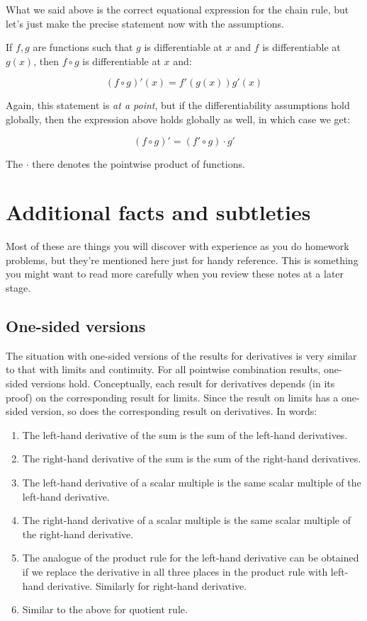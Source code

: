 \documentclass[10pt]{amsart}
\begin{document}
What we said above is the correct equational expression for the chain
rule, but let's just make the precise statement now with the assumptions.

If $f,g$ are functions such that $g$ is differentiable at $x$ and $f$
is differentiable at $g(x)$, then $f \circ g$ is differentiable at $x$
and:

$$(f \circ g)'(x) = f'(g(x))g'(x)$$

Again, this statement is {\em at a point}, but if the
differentiability assumptions hold globally, then the expression above
holds globally as well, in which case we get:

$$(f \circ g)' = (f' \circ g) \cdot g'$$

The $\cdot$ there denotes the pointwise product of functions.

\section{Additional facts and subtleties}

Most of these are things you will discover with experience as you do
homework problems, but they're mentioned here just for handy
reference. This is something you might want to read more carefully when
you review these notes at a later stage.

\subsection{One-sided versions}

The situation with one-sided versions of the results for derivatives
is very similar to that with limits and continuity. For all pointwise
combination results, one-sided versions hold. Conceptually, each
result for derivatives depends (in its proof) on the corresponding
result for limits. Since the result on limits has a one-sided version,
so does the corresponding result on derivatives. In words:

\begin{enumerate}
\item The left-hand derivative of the sum is the sum of the left-hand
  derivatives.
\item The right-hand derivative of the sum is the sum of the
  right-hand derivatives.
\item The left-hand derivative of a scalar multiple is the same scalar
  multiple of the left-hand derivative.
\item The right-hand derivative of a scalar multiple is the same
  scalar multiple of the right-hand derivative.
\item The analogue of the product rule for the left-hand derivative
  can be obtained if we replace the derivative in all three places in
  the product rule with left-hand derivative. Similarly for right-hand
  derivative.
\item Similar to the above for quotient rule.
\end{enumerate}
\end{document}
